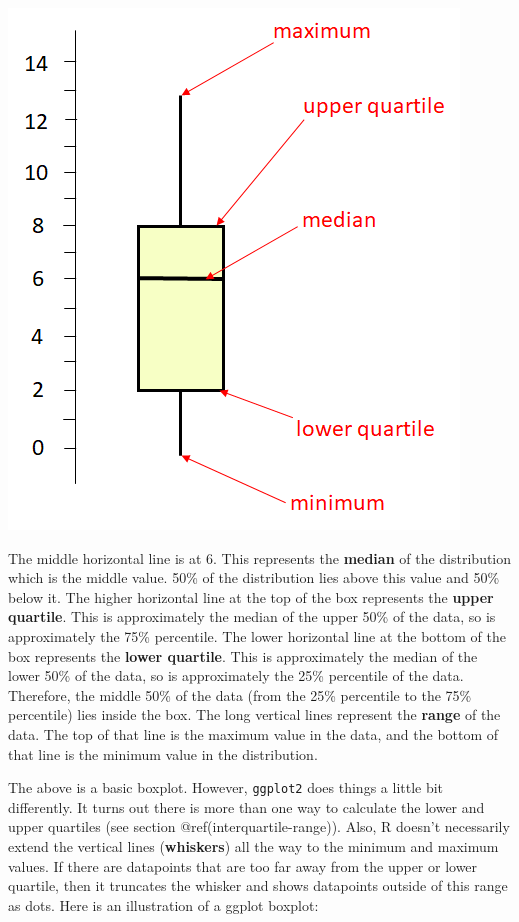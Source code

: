\documentclass[
  letterpaper,
  DIV=11,
  numbers=noendperiod]{scrreprt}
\begin{document}
\includegraphics{./img/box2.png}

The middle horizontal line is at 6. This represents the \textbf{median}
of the distribution which is the middle value. 50\% of the distribution
lies above this value and 50\% below it. The higher horizontal line at
the top of the box represents the \textbf{upper quartile}. This is
approximately the median of the upper 50\% of the data, so is
approximately the 75\% percentile. The lower horizontal line at the
bottom of the box represents the \textbf{lower quartile}. This is
approximately the median of the lower 50\% of the data, so is
approximately the 25\% percentile of the data. Therefore, the middle
50\% of the data (from the 25\% percentile to the 75\% percentile) lies
inside the box. The long vertical lines represent the \textbf{range} of
the data. The top of that line is the maximum value in the data, and the
bottom of that line is the minimum value in the distribution.

The above is a basic boxplot. However, \texttt{ggplot2} does things a
little bit differently. It turns out there is more than one way to
calculate the lower and upper quartiles (see section
@ref(interquartile-range)). Also, R doesn't necessarily extend the
vertical lines (\textbf{whiskers}) all the way to the minimum and
maximum values. If there are datapoints that are too far away from the
upper or lower quartile, then it truncates the whisker and shows
datapoints outside of this range as dots. Here is an illustration of a
ggplot boxplot:
\end{document}
